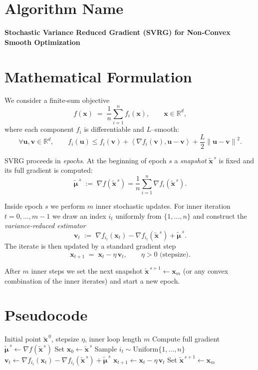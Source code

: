 \documentclass{article}
\newcommand{\RR}{\mathbb{R}}
\newcommand{\norm}[1]{\left\|#1\right\|}
\newcommand{\inner}[2]{\left\langle #1,#2\right\rangle}
\newcommand{\grad}{\nabla}
\begin{document}
\section*{Algorithm Name}
\textbf{Stochastic Variance Reduced Gradient (SVRG) for Non‑Convex Smooth Optimization}

\section*{Mathematical Formulation}
We consider a finite‑sum objective
\[
f(\mathbf{x})\;=\;\frac{1}{n}\sum_{i=1}^{n} f_i(\mathbf{x}),\qquad 
\mathbf{x}\in\RR^{d},
\]
where each component $f_i$ is differentiable and $L$–smooth:
\[
\forall \mathbf{u},\mathbf{v}\in\RR^{d},\qquad 
f_i(\mathbf{u})\le f_i(\mathbf{v})+\inner{\grad f_i(\mathbf{v})}{\mathbf{u}-\mathbf{v}}+
\frac{L}{2}\norm{\mathbf{u}-\mathbf{v}}^{2}. \tag{1}
\]

SVRG proceeds in \emph{epochs}.  At the beginning of epoch $s$ a \emph{snapshot}
$\tilde{\mathbf{x}}^{\,s}$ is fixed and its full gradient is computed:
\[
\tilde{\bm\mu}^{\,s}\;:=\;\grad f(\tilde{\mathbf{x}}^{\,s})=
\frac{1}{n}\sum_{i=1}^{n}\grad f_i(\tilde{\mathbf{x}}^{\,s}). \tag{2}
\]

Inside epoch $s$ we perform $m$ inner stochastic updates.  
For inner iteration $t=0,\dots,m-1$ we draw an index $i_t$ uniformly
from $\{1,\dots,n\}$ and construct the \emph{variance‑reduced estimator}
\[
\mathbf{v}_{t}
\;:=\;\grad f_{i_t}(\mathbf{x}_{t})-
\grad f_{i_t}(\tilde{\mathbf{x}}^{\,s})+\tilde{\bm\mu}^{\,s}. \tag{3}
\]
The iterate is then updated by a standard gradient step
\[
\mathbf{x}_{t+1}\;=\;\mathbf{x}_{t}-\eta\,\mathbf{v}_{t}, \qquad
\eta>0\text{ (stepsize).} \tag{4}
\]

After $m$ inner steps we set the next snapshot
$\tilde{\mathbf{x}}^{\,s+1}\gets\mathbf{x}_{m}$ (or any convex combination of the
inner iterates) and start a new epoch.

\section*{Pseudocode}
\begin{algorithm}[H]
\caption{SVRG for non‑convex $L$‑smooth finite‑sum problems}
\label{alg:svrg}
\begin{algorithmic}[1]
\REQUIRE Initial point $\tilde{\mathbf{x}}^{\,0}$, stepsize $\eta$, inner loop length $m$
    \STATE Compute full gradient $\tilde{\bm\mu}^{\,s}\gets\grad f(\tilde{\mathbf{x}}^{\,s})$ \label{alg:fullgrad}
    \STATE Set $\mathbf{x}_{0}\gets\tilde{\mathbf{x}}^{\,s}$
        \STATE Sample $i_{t}\sim\text{Uniform}\{1,\dots,n\}$
        \STATE $\mathbf{v}_{t}\gets\grad f_{i_t}(\mathbf{x}_{t})-
               \grad f_{i_t}(\tilde{\mathbf{x}}^{\,s})+\tilde{\bm\mu}^{\,s}$ \label{alg:vr}
        \STATE $\mathbf{x}_{t+1}\gets\mathbf{x}_{t}-\eta\,\mathbf{v}_{t}$ \label{alg:update}
    \ENDFOR
    \STATE Set $\tilde{\mathbf{x}}^{\,s+1}\gets\mathbf{x}_{m}$  
\ENDFOR
\end{algorithmic}
\end{algorithm}
\end{document}
